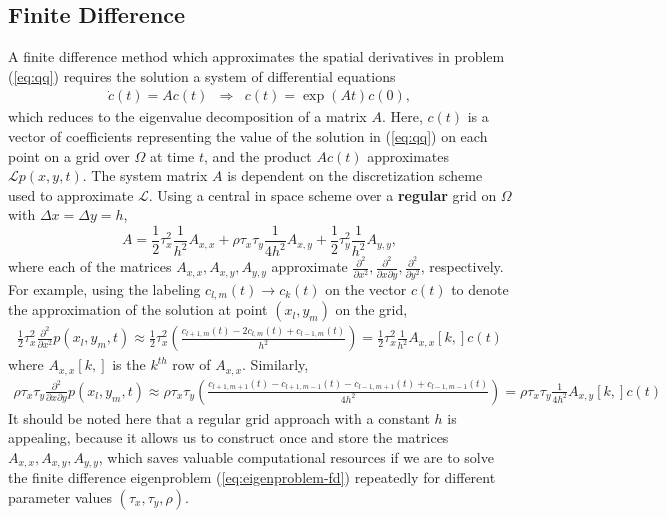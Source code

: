 \documentclass[10pt]{article}
\begin{document}
\subsection{Finite Difference} \label{sec:finite-difference} A finite
difference method which approximates the spatial derivatives in
problem (\ref{eq:qq}) requires the solution a system of differential
equations
\begin{align}
  \dot{c}(t)= A c(t) &\Rightarrow& c(t) = \exp\left( At \right)c(0) \label{eq:eigenproblem-fd}, 
\end{align}
which reduces to the eigenvalue decomposition of a matrix $A$. Here,
$c(t)$ is a vector of coefficients representing the value of the
solution in (\ref{eq:qq}) on each point on a grid over $\Omega$ at
time $t$, and the product $Ac(t)$ approximates
$\mathcal{L}p(x,y,t)$. The system matrix $A$ is dependent on the
discretization scheme used to approximate $\mathcal{L}$. Using a
central in space scheme over a \textbf{regular} grid on $\Omega$ with
$\Delta x = \Delta y = h$,
\[ A = \frac{1}{2}\tau_x^2 \frac{1}{h^2}A_{x,x} +
  \rho\tau_x\tau_y \frac{1}{4h^2}A_{x,y} + \frac{1}{2}\tau_y^2
  \frac{1}{h^2}A_{y,y},
\]
where each of the matrices $A_{x,x}, A_{x,y}, A_{y,y}$ approximate
$\frac{\partial^2}{\partial x^2}, \frac{\partial^2}{\partial
  x \partial y}, \frac{\partial^2}{\partial y^2}$, respectively. For
example, using the labeling $c_{l,m}(t) \to c_k(t)$ on the vector
$c(t)$ to denote the approximation of the solution at point
$(x_l, y_m)$ on the grid,
\begin{align*}
  \frac{1}{2}\tau_x^2 \frac{\partial^2}{\partial x^2} p(x_l,y_m,t) \approx \frac{1}{2}\tau_x^2 \left( \frac{c_{l+1,m}(t) - 2c_{l,m}(t) + c_{l-1,m}(t)}{h^2} \right) = \frac{1}{2}\tau_x^2 \frac{1}{h^2}A_{x,x}[k,] c(t) 
\end{align*}
where $A_{x,x}[k,]$ is the $k^{th}$ row of $A_{x,x}$. Similarly,
\begin{align*}
  \rho\tau_x\tau_y \frac{\partial^2}{\partial x \partial y} p(x_l,y_m,t) \approx \rho\tau_x\tau_y \left( \frac{c_{l+1,m+1}(t) - c_{l+1,m-1}(t) - c_{l-1,m+1}(t) + c_{l-1,m-1}(t)}{4h^2} \right) = \rho\tau_x\tau_y \frac{1}{4h^2}A_{x,y}[k,] c(t) 
\end{align*}
It should be noted here that a regular grid approach with a constant
$h$ is appealing, because it allows us to construct once and store the
matrices $A_{x,x}, A_{x,y}, A_{y,y}$, which saves valuable
computational resources if we are to solve the finite difference
eigenproblem (\ref{eq:eigenproblem-fd}) repeatedly for different
parameter values $(\tau_x,\tau_y,\rho)$.
\end{document}
